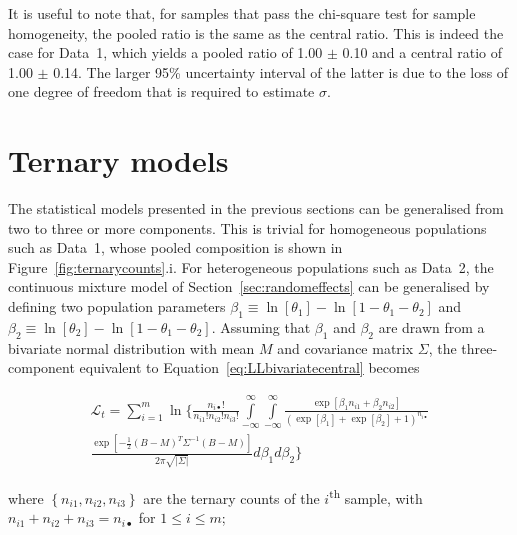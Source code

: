 \documentclass{article}
\begin{document}
It is useful to note that, for samples that pass the chi-square test
for sample homogeneity, the pooled ratio is the same as the central
ratio. This is indeed the case for Data~1, which yields a pooled ratio
of 1.00 $\pm$ 0.10 and a central ratio of 1.00 $\pm$ 0.14. The larger
95\% uncertainty interval of the latter is due to the loss of one
degree of freedom that is required to estimate $\hat{\sigma}$.

\section{Ternary models}
\label{sec:ternary}

The statistical models presented in the previous sections can be
generalised from two to three or more components. This is trivial for
homogeneous populations such as Data~1, whose pooled composition is
shown in Figure~\ref{fig:ternarycounts}.i.  For heterogeneous
populations such as Data~2, the continuous mixture model of
Section~\ref{sec:randomeffects} can be generalised by defining two
population parameters $\beta_1 \equiv
\ln[\theta_1]-\ln[1-\theta_1-\theta_2]$ and $\beta_2 \equiv
\ln[\theta_2]-\ln[1-\theta_1-\theta_2]$.  Assuming that $\beta_1$ and
$\beta_2$ are drawn from a bivariate normal distribution with mean $M$
and covariance matrix $\Sigma$, the three-component equivalent to
Equation~\ref{eq:LLbivariatecentral} becomes

\begin{equation}
  \begin{split}
    \mathcal{L}_t =
    \sum\limits_{i=1}^{m}\ln\biggl\{
      \frac{n_{i\bullet}!}{n_{i1}! n_{i2}! n_{i3}!}
      \int\limits_{-\infty}^{\infty}\int\limits_{-\infty}^{\infty}
      \frac{\exp\left[\beta_1 n_{i1} + \beta_2 n_{i2}\right]}
           {\left(\exp\left[\beta_1\right] +
             \exp\left[\beta_2\right] + 1\right)^{n_{i\bullet}}}\\
           \frac{\exp\left[
               -\frac{1}{2}
               \left(B-M\right)^T \Sigma^{-1} \left(B-M\right)
               \right]
           }{
             2\pi\sqrt{|\Sigma|}
           }
           d\beta_1 d\beta_2\biggr\}
  \end{split}
  \label{eq:LLternarycentral}
\end{equation}

\noindent where $\left\{n_{i1},n_{i2},n_{i3}\right\}$ are the ternary
counts of the $i$\textsuperscript{th} sample, with $n_{i1} + n_{i2} +
n_{i3} = n_{i\bullet}$ for $1 \leq i \leq m$;
\end{document}
